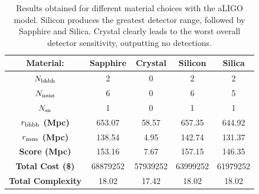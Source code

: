 \documentclass{article}
\begin{document}
    \begin{table}[h]
    	\centering
  \captionsetup{width=0.9\textwidth}
         \caption{Results obtained for different material choices with
           the aLIGO model. Silicon produces the greatest detector
           range, followed by Sapphire and Silica. Crystal clearly
           leads to the worst overall detector sensitivity, outputting
           no detections.}
    \begin{tabular}{ |c|c|c|c|c| } 
     \hline
     \textbf{Material:} & \textbf{Sapphire}  & \textbf{Crystal}  & \textbf{Silicon}  & \textbf{Silica} \\ 
     \hline
     \textbf{$N_{\rm bhbh}$}  & 2 & 0 & 2 & 2\\ 
     \hline
     \textbf{$N_{\rm nsns}$}  & 6 & 0 & 6 & 5\\ 
     \hline
     \textbf{$N_{\rm sn}$}  & 1 & 0  & 1 & 1 \\ 
     \hline
     \textbf{$r_{\rm bhbh}$ (Mpc)}  & 653.07 & 58.57  & 657.35  & 644.92 \\ 
     \hline
      \textbf{$r_{\rm nsns}$ (Mpc)}  & 138.54  & 4.95  & 142.74 & 131.37 \\ 
      \hline
    \textbf{Score (Mpc)}  & 153.16  & 7.67  & 157.15  & 146.35 \\
    \hline
    \textbf{Total Cost (\$)}  & 68879252  & 57939252  & 63999252  & 61979252 \\ 
    \hline
      \textbf{Total Complexity}  & 18.02  & 17.42  & 18.02  & 18.02 \\ 
     \hline
    \end{tabular}
    \label{tab::materialstest}

    \end{table}
    
\end{document}
